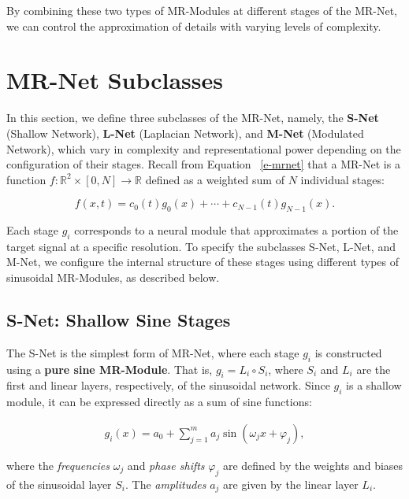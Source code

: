 By combining these two types of MR-Modules at different stages of the MR-Net, we can control the approximation of details with varying levels of complexity. 


\section{MR-Net Subclasses}

In this section, we define three subclasses of the MR-Net, namely, the \textbf{S-Net} (Shallow Network), \textbf{L-Net} (Laplacian Network), and \textbf{M-Net} (Modulated Network), which vary in complexity and representational power depending on the configuration of their stages. Recall from Equation ~\ref{e-mrnet} that a MR-Net is a function \( f : \mathbb{R}^2 \times [0, N] \to \mathbb{R} \) defined as a weighted sum of \( N \) individual stages:

\[
f(x, t) = c_0(t)g_0(x) + \cdots + c_{N-1}(t)g_{N-1}(x).
\]

Each stage \( g_i \) corresponds to a neural module that approximates a portion of the target signal at a specific resolution. To specify the subclasses S-Net, L-Net, and M-Net, we configure the internal structure of these stages using different types of sinusoidal MR-Modules, as described below.

\subsection{S-Net: Shallow Sine Stages}

The S-Net is the simplest form of MR-Net, where each stage \( g_i \) is constructed using a \textbf{pure sine MR-Module}. That is, \( g_i = L_i \circ S_i \), where \( S_i \) and \( L_i \) are the first and linear layers, respectively, of the sinusoidal network. Since \( g_i \) is a shallow module, it can be expressed directly as a sum of sine functions:

\begin{align}
    g_i(x) = a_0 + \sum_{j=1}^m a_j \sin\left(\omega_j x + \varphi_j\right),
\end{align}


where the \textit{frequencies} \( \omega_j \) and \textit{phase shifts} \( \varphi_j \) are defined by the weights and biases of the sinusoidal layer \( S_i \). The \textit{amplitudes} \( a_j \) are given by the linear layer \( L_i \).

